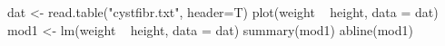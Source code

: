 \begin{Schunk}
\begin{Sinput}
 dat <- read.table("cystfibr.txt", header=T)
 plot(weight ~ height, data = dat) 
 mod1 <- lm(weight ~ height, data = dat)
 summary(mod1)
 abline(mod1)
\end{Sinput}
\end{Schunk}
